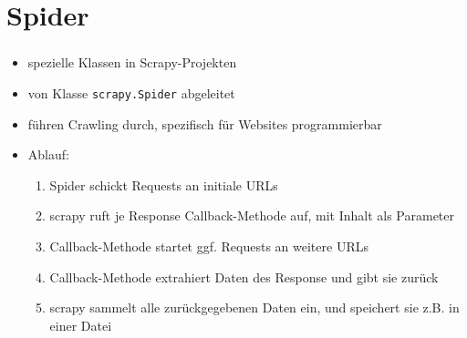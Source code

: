 \documentclass{beamer}
\begin{document}
\section{Spider}
\begin{frame}[fragile]
	\frametitle{\insertsection}
	\begin{itemize}
		\item spezielle Klassen in Scrapy-Projekten
		\item von Klasse \verb|scrapy.Spider| abgeleitet
		\item führen Crawling durch, spezifisch für Websites programmierbar
		\item Ablauf: \begin{enumerate}		
			\item Spider schickt Requests an initiale URLs
			\item scrapy ruft je Response Callback-Methode auf, mit Inhalt als Parameter
			\item Callback-Methode startet ggf. Requests an weitere URLs
			\item Callback-Methode extrahiert Daten des Response und gibt sie zurück
			\item scrapy sammelt alle zurückgegebenen Daten ein, und speichert sie z.B. in einer Datei
		\end{enumerate}
	\end{itemize}
\end{frame}
\end{document}
